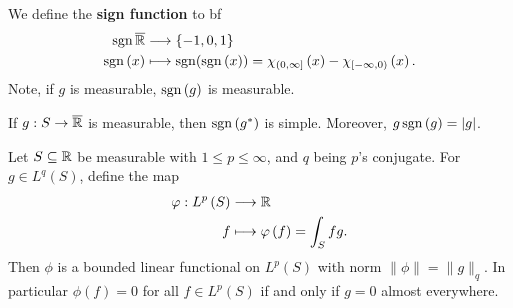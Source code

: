 \begin{definition}
We define the \textbf{sign function} to bf \begin{align*}
	\operatorname{sgn} \overline{\mathbb{R}} &\longrightarrow \{-1, 0, 1\}  \\
	\operatorname{sgn}\left( x \right)  &\longmapsto \operatorname{sgn}(\operatorname{sgn}\left( x \right) ) = \chi_{\left( 0, \infty \right] }\left( x \right)  - \chi_{\left[ -\infty, 0 \right) }\left( x \right)
.\end{align*}
Note, if \(g\) is measurable, \(\operatorname{sgn}\left( g \right) \) is measurable.
\end{definition}
\begin{remark}
	If \(g: S \to \overline{\mathbb{R}}\) is measurable, then \(\operatorname{sgn}\left( g^{*} \right) \) is simple. Moreover, \(g \operatorname{sgn}\left( g \right) = \left| g \right| \).
\end{remark}
\begin{theorem}
	Let \(S \subseteq \mathbb{R}\) be measurable with \(1 \le p \le \infty\), and \(q\) being \(p\)'s conjugate. For \(g \in L^{q}\left( S \right) \), define the map \begin{align*}
		\varphi: L^{p}\left( S \right)   &\longrightarrow  \mathbb{R} \\
		f &\longmapsto \varphi\left( f \right)= \int_{S}  fg
	.\end{align*}
	Then \(\phi\) is a bounded linear functional on \(L^{p}\left( S \right) \) with norm \(\|\phi\| = \|g\|_{q}\). In particular \(\phi\left( f \right) = 0\) for all \(f\in L^{p}\left( S \right) \)  if and only if \(g = 0\) almost everywhere.
\end{theorem}

